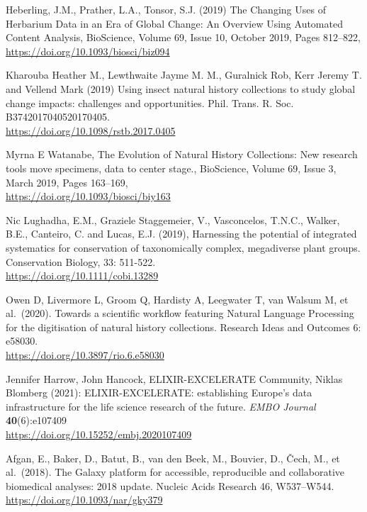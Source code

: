 \begin{thebibliography}{9}
 Heberling, J.M., Prather, L.A., Tonsor, S.J. (2019) The
Changing Uses of Herbarium Data in an Era of Global Change: An Overview
Using Automated Content Analysis, BioScience, Volume 69, Issue 10,
October 2019, Pages 812--822,\\
\url{https://doi.org/10.1093/biosci/biz094}

 Kharouba Heather M., Lewthwaite Jayme M. M., Guralnick Rob,
Kerr Jeremy T. and Vellend Mark (2019) Using insect natural history
collections to study global change impacts: challenges and
opportunities. Phil. Trans. R. Soc. B3742017040520170405.\\
\url{https://doi.org/10.1098/rstb.2017.0405}

 Myrna E Watanabe, The Evolution of Natural History Collections:
New research tools move specimens, data to center stage., BioScience,
Volume 69, Issue 3, March 2019, Pages 163--169,\\
\url{https://doi.org/10.1093/biosci/biy163}

 Nic Lughadha, E.M., Graziele Staggemeier, V., Vasconcelos,
T.N.C., Walker, B.E., Canteiro, C. and Lucas, E.J. (2019), Harnessing
the potential of integrated systematics for conservation of
taxonomically complex, megadiverse plant groups. Conservation Biology,
33: 511-522.\\
\url{https://doi.org/10.1111/cobi.13289}

 Owen D, Livermore L, Groom Q, Hardisty A, Leegwater T, van
Walsum M, et al.~(2020). Towards a scientific workflow featuring Natural
Language Processing for the digitisation of natural history collections.
Research Ideas and Outcomes 6: e58030.\\
\url{https://doi.org/10.3897/rio.6.e58030}

 Jennifer Harrow, John Hancock, ELIXIR-EXCELERATE Community,
Niklas Blomberg (2021): ELIXIR-EXCELERATE: establishing Europe's data
infrastructure for the life science research of the future. \emph{EMBO
Journal} \textbf{40}(6):e107409\\
\url{https://doi.org/10.15252/embj.2020107409}

 Afgan, E., Baker, D., Batut, B., van den Beek, M., Bouvier, D.,
Čech, M., et al.~(2018). The Galaxy platform for accessible,
reproducible and collaborative biomedical analyses: 2018 update. Nucleic
Acids Research 46, W537--W544.\\
\url{https://doi.org/10.1093/nar/gky379}


\end{thebibliography}
